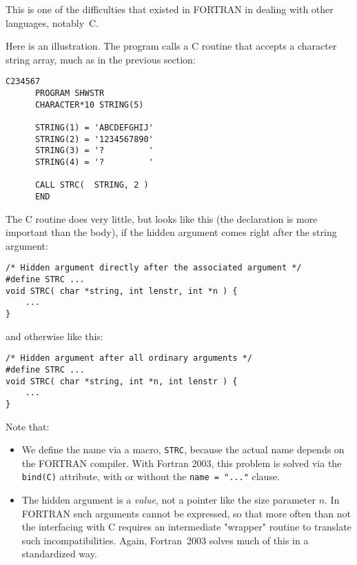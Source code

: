 This is one of the difficulties that existed in FORTRAN in dealing with other languages, notably~C.

Here is an illustration. The program calls a C routine that accepts a character string array,
much as in the previous section:
\begin{verbatim}
C234567
      PROGRAM SHWSTR
      CHARACTER*10 STRING(5)

      STRING(1) = 'ABCDEFGHIJ'
      STRING(2) = '1234567890'
      STRING(3) = '?         '
      STRING(4) = '?         '

      CALL STRC(  STRING, 2 )
      END
\end{verbatim}

The C routine does very little, but looks like this (the declaration is more important than
the body), if the hidden argument comes right after the string argument:
\begin{verbatim}
/* Hidden argument directly after the associated argument */
#define STRC ...
void STRC( char *string, int lenstr, int *n ) {
    ...
}
\end{verbatim}

\noindent and otherwise like this:

\begin{verbatim}
/* Hidden argument after all ordinary arguments */
#define STRC ...
void STRC( char *string, int *n, int lenstr ) {
    ...
}
\end{verbatim}

Note that:
\begin{itemize}
\item
We define the name via a macro, \verb+STRC+, because the actual name depends on the FORTRAN compiler.
With Fortran 2003, this problem is solved via the \verb+bind(C)+ attribute, with or without the \verb+name = "..."+ clause.
\item
The hidden argument is a \emph{value}, not a pointer like the size parameter $n$. In FORTRAN such arguments
cannot be expressed, so that more often than not the interfacing with C requires an intermediate "wrapper" routine
to translate such incompatibilities. Again, Fortran~2003 solves much of this in a standardized way.
\end{itemize}
